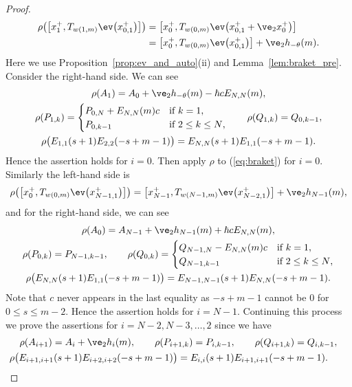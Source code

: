 \begin{proof}
\begin{gather*}
\begin{split}&
 \rho\big(\big[x_1^+, T_{w(1,m)} \ev\big(x_{0,1}^+\big)\big]\big)=\big[x_0^+, T_{w(0,m)} \ev\big(x_{0,1}^++\ve_2 x_0^+\big)\big]\\
& \hphantom{\rho\big(\big[x_1^+, T_{w(1,m)} \ev\big(x_{0,1}^+\big)\big]\big)}{} = \big[x_0^+, T_{w(0,m)} \ev\big(x_{0,1}^+\big)\big] + \ve_2 h_{-\theta}(m).
\end{split}
\end{gather*}
Here we use Proposition~\ref{prop:ev_and_auto}(ii) and Lemma~\ref{lem:braket_pre}. Consider the right-hand side. We can see
\begin{gather*}
\rho(A_1) = A_0 + \ve_2 h_{-\theta}(m) - \hbar c E_{N,N}(m),\\
\rho(P_{1,k}) = \begin{cases}
P_{0,N} + E_{N,N}(m)c & \text{if $k=1$},\\
P_{0,k-1} & \text{if $2 \leq k \leq N$},
\end{cases}\qquad
\rho(Q_{1,k}) = Q_{0,k-1},\\
\rho\big(E_{1,1}(s+1)E_{2,2}(-s+m-1)\big) = E_{N,N}(s+1)E_{1,1}(-s+m-1).
\end{gather*}
Hence the assertion holds for $i=0$. Then apply $\rho$ to (\ref{eq:braket}) for $i=0$. Similarly the left-hand side is
\begin{gather*}
 \rho\big(\big[x_0^+, T_{w(0,m)} \ev\big(x_{N-1,1}^+\big)\big]\big)= \big[x_{N-1}^+, T_{w(N-1,m)} \ev\big(x_{N-2,1}^+\big)\big] + \ve_2 h_{N-1}(m),
\end{gather*}
and for the right-hand side, we can see
\begin{gather*}
\rho(A_0) = A_{N-1} + \ve_2 h_{N-1}(m) + \hbar c E_{N,N}(m),\\
\rho(P_{0,k}) = P_{N-1,k-1}, \qquad \rho(Q_{0,k}) = \begin{cases}
Q_{N-1,N} - E_{N,N}(m)c & \text{if $k=1$},\\
Q_{N-1,k-1} & \text{if $2 \leq k \leq N$},
\end{cases}\\
\rho\big(E_{N,N}(s+1)E_{1,1}(-s+m-1)\big) = E_{N-1,N-1}(s+1)E_{N,N}(-s+m-1).
\end{gather*}
Note that $c$ never appears in the last equality as $-s+m-1$ cannot be $0$ for $0 \leq s \leq m-2$. Hence the assertion holds for $i=N-1$. Continuing this process we prove the assertions for $i=N-2, N-3,\ldots,2$ since we have
\begin{gather*}
\rho(A_{i+1}) = A_{i} + \ve_2 h_{i}(m),\qquad \rho(P_{i+1,k}) = P_{i,k-1}, \qquad \rho(Q_{i+1,k}) =Q_{i,k-1},\\
\rho\big(E_{i+1,i+1}(s+1)E_{i+2,i+2}(-s+m-1)\big) = E_{i,i}(s+1)E_{i+1,i+1}(-s+m-1).\tag*{\qed}
\end{gather*}\renewcommand{\qed}{}
\end{proof}

